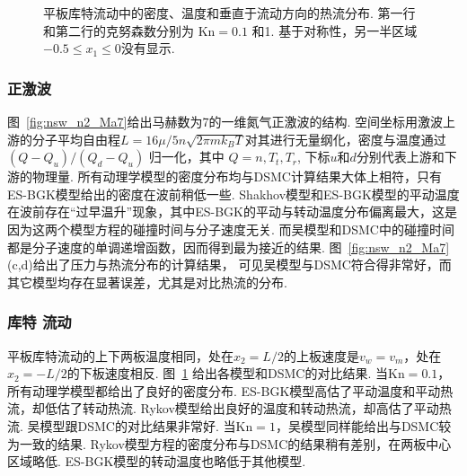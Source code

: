 \begin{figure}[t]
	\caption{ 
		平板库特流动中的密度、温度和垂直于流动方向的热流分布. 第一行和第二行的克努森数分别为 $\text{Kn}=0.1$ 和1. 基于对称性，另一半区域$-0.5\le{}x_1\le0$没有显示. 
	}
	\label{fig:Couette}
\end{figure}



\subsubsection{正激波}






图~\ref{fig:nsw_n2_Ma7}给出马赫数为7的一维氮气正激波的结构. 空间坐标用激波上游的分子平均自由程$L=16\mu/5n\sqrt{2\pi{m}k_BT}$对其进行无量纲化，密度与温度通过 $ (Q-Q_u)/(Q_d-Q_u) $ 归一化，其中 $Q=n, T_t, T_r$, 下标$u$和$d$分别代表上游和下游的物理量. 所有动理学模型的密度分布均与DSMC计算结果大体上相符，只有ES-BGK模型给出的密度在波前稍低一些. Shakhov模型和ES-BGK模型的平动温度在波前存在“过早温升”现象，其中ES-BGK的平动与转动温度分布偏离最大，这是因为这两个模型方程的碰撞时间与分子速度无关. 而吴模型和DSMC中的碰撞时间都是分子速度的单调递增函数，因而得到最为接近的结果. 图~\ref{fig:nsw_n2_Ma7}(c,d)给出了压力与热流分布的计算结果， 可见吴模型与DSMC符合得非常好，而其它模型均存在显著误差，尤其是对比热流的分布.






\subsubsection{库特 流动}\label{sec:planar-couette-flow}

平板库特流动的上下两板温度相同，处在$x_2=L/2$的上板速度是$ v_w=v_m $，处在$x_2=-L/2$的下板速度相反. 图~\ref{fig:Couette} 给出各模型和DSMC的对比结果. 当$\text{Kn}=0.1$，所有动理学模型都给出了良好的密度分布. ES-BGK模型高估了平动温度和平动热流，却低估了转动热流. Rykov模型给出良好的温度和转动热流，却高估了平动热流. 吴模型跟DSMC的对比结果非常好. 当$ \text{Kn}=1 $，吴模型同样能给出与DSMC较为一致的结果. Rykov模型方程的密度分布与DSMC的结果稍有差别，在两板中心区域略低. ES-BGK模型的转动温度也略低于其他模型. 

